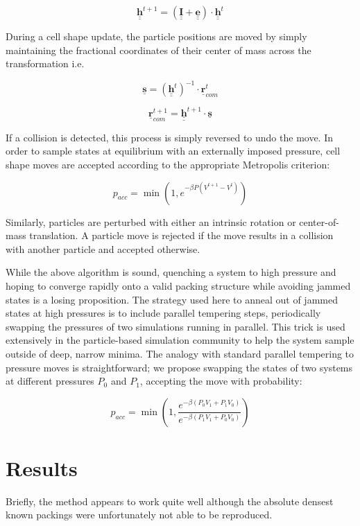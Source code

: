 \documentclass[12pt,a4paper]{article}
\begin{document}
$$ \underline{\underline{\mathbf{h}}}^{t+1} = \left( \underline{\underline{\mathbf{I}}} +  \underline{\underline{\mathbf{e}}} \right) \cdot  \underline{\underline{\mathbf{h}}}^{t}$$

During a cell shape update, the particle positions are moved by simply maintaining the fractional coordinates of their center of mass across the transformation i.e.

$$\underline{\mathbf{s}} = \left(\underline{\underline{\mathbf{h}}}^{t}\right)^{-1} \cdot \underline{\mathbf{r}}_{com}^t $$

$$\underline{\mathbf{r}}_{com}^{t+1} = \underline{\underline{\mathbf{h}}}^{t+1} \cdot \underline{\mathbf{s}} $$

If a collision is detected, this process is simply reversed to undo the move. In order to sample states at equilibrium with an externally imposed pressure, cell shape moves are accepted according to the appropriate Metropolis criterion:

$$ p_{acc} = \min\left(1, e^{-\beta P\left(V^{t+1} - V^{t}\right)} \right)$$

Similarly, particles are perturbed with either an intrinsic rotation or center-of-mass translation. A particle move is rejected if the move results in a collision with another particle and accepted otherwise.

While the above algorithm is sound, quenching a system to high pressure and hoping to converge rapidly onto a valid packing structure while avoiding jammed states is a losing proposition. The strategy used here to anneal out of jammed states at high pressures is to include parallel tempering steps, periodically swapping the pressures of two simulations running in parallel. This trick is used extensively in the particle-based simulation community to help the system sample outside of deep, narrow minima. The analogy with standard parallel tempering to pressure moves is straightforward; we propose swapping the states of two systems at different pressures $P_0$ and $P_1$, accepting the move with probability:

$$ p_{acc} = \min\left(1, \frac{e^{-\beta \left(P_0 V_1 + P_1 V_0\right)}}{e^{-\beta \left(P_1 V_1 + P_0 V_0\right)}}\right)$$

\section*{Results}

Briefly, the method appears to work quite well although the absolute densest known packings were unfortunately not able to be reproduced. 
\end{document}
